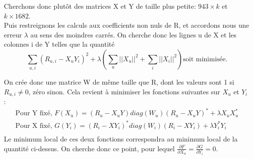 \documentclass[12pt,a4paper]{article}
\begin{document}
\newpage
Cherchons donc plutôt des matrices X et Y de taille plus petite: $943\times k$ et $k\times 1682$.\\
Puis restreignons les calculs aux coefficients non nuls de R, et accordons nous une erreur $\lambda$ au sens des moindres carrés. On cherche donc les lignes u de X et les colonnes i de Y telles que la quantité
$$\sum_{u,i} (R_{u,i}-X_uY_i)^2+\lambda \left(\sum_u ||X_u||^2 + \sum_i ||X_i||^2 \right) \text{soit minimisée.}$$

On crée donc une matrice W de même taille que R, dont les valeurs sont 1 si $R_{u,i} \neq 0$, zéro sinon. Cela revient à minimiser les fonctions suivantes sur $X_u$ et $Y_i$ :
$$\begin{array}{l}
\text{Pour Y fixé, } F(X_u) = (R_u -X_uY) diag(W_u) (R_u -X_uY)^* + \lambda X_u X_u^*\\
\text{Pour X fixé, } G(Y_i) = (R_i -XY_i)^* diag(W_i) (R_i -XY_i) + \lambda Y_i^*Y_i\\
\end{array}$$
Le minimum local de ces deux fonctions correspondra au minimum local de la quantité ci-dessus. On cherche donc ce point, pour lequel $\frac{\partial F}{\partial X_u}=\frac{\partial G}{\partial Y_i}=0$.
\end{document}
